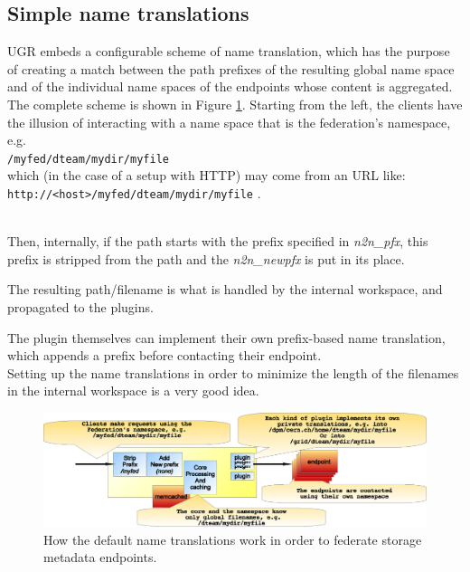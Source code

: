 \documentclass[12pt]{article} %
\begin{document}
\subsection{Simple name translations}

UGR embeds a configurable scheme of name translation, which has the purpose of creating a match between the path prefixes of the resulting global name space and of the individual name spaces of the endpoints whose content is aggregated.\\
The complete scheme is shown in Figure \ref{fig_n2n}. Starting from the left, the clients have the illusion of interacting with a name space that is the federation's namespace, e.g.\\

 \verb"/myfed/dteam/mydir/myfile"\\
 
 which (in the case of a setup with HTTP) may come from an URL like:\\
 
 \verb"http://<host>/myfed/dteam/mydir/myfile" .\\\
 
 Then, internally, if the path starts with the prefix specified in \textit{n2n\_pfx}, this prefix is stripped from the path and the \textit{n2n\_newpfx} is put in its place.
 
 The resulting path/filename is what is handled by the internal workspace, and propagated to the plugins.
 
  The plugin themselves can implement their own prefix-based name translation, which appends a prefix before contacting their endpoint.\\
  
 Setting up the name translations in order to minimize the length of the filenames in the internal workspace is a very good idea.\\





\begin{figure}
  \begin{center}
    \includegraphics[width=36pc]{n2n.eps}
  \end{center}
  \caption{\label{fig_n2n}How the default name translations work in order to federate storage metadata endpoints.}
\end{figure}
\end{document}
